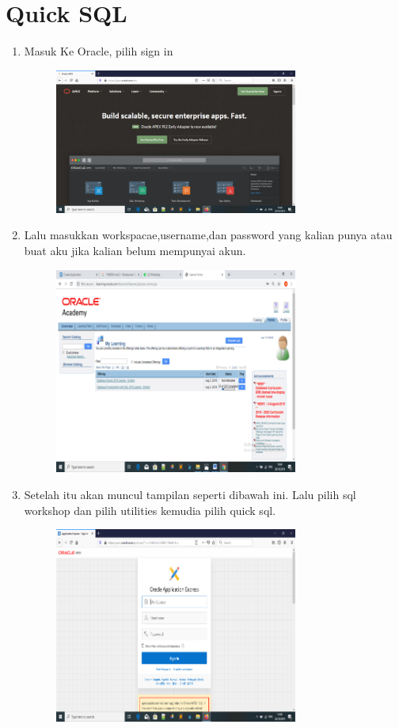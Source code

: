 \documentclass{article}
\begin{document}
\section{Quick SQL}
\begin{enumerate}
\item Masuk Ke Oracle, pilih sign in
\begin{figure}[h]
\centerline{\includegraphics[width=8cm]{figure/si.png}}
\end{figure}
 \item Lalu masukkan workspacae,username,dan password yang kalian punya atau buat aku jika kalian belum mempunyai akun.
\begin{figure}[h]
\centerline{\includegraphics[width=8cm]{figure/a.png}}
\end{figure}
 \newpage\item Setelah itu akan muncul tampilan seperti dibawah ini. Lalu pilih sql workshop dan pilih utilities kemudia pilih quick sql.
\begin{figure}[h]
\centerline{\includegraphics[width=8cm]{figure/b.png}}

\end{figure}
\end{enumerate}
\end{document}
